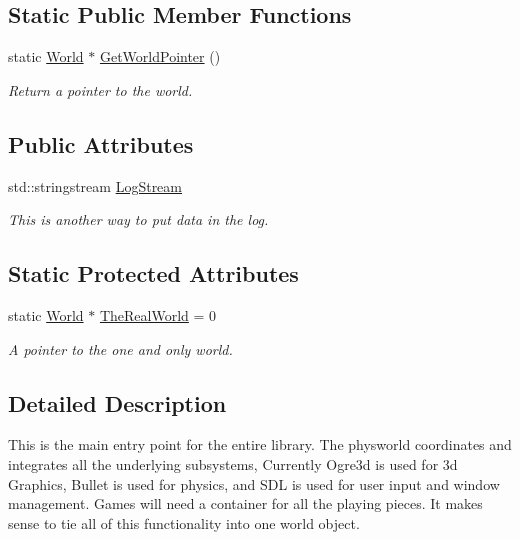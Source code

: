 \subsection*{Static Public Member Functions}
\begin{DoxyCompactItemize}
\item 
static \hyperlink{classphys_1_1World}{World} $\ast$ \hyperlink{classphys_1_1World_ac7b8470a75353497bf8f85a8d3cd24e4}{GetWorldPointer} ()
\begin{DoxyCompactList}\small\item\em Return a pointer to the world. \item\end{DoxyCompactList}\end{DoxyCompactItemize}
\subsection*{Public Attributes}
\begin{DoxyCompactItemize}
\item 
std::stringstream \hyperlink{classphys_1_1World_a6d8b325a077afc924afb70c259ec0299}{LogStream}
\begin{DoxyCompactList}\small\item\em This is another way to put data in the log. \item\end{DoxyCompactList}\end{DoxyCompactItemize}
\subsection*{Static Protected Attributes}
\begin{DoxyCompactItemize}
\item 
static \hyperlink{classphys_1_1World}{World} $\ast$ \hyperlink{classphys_1_1World_a78f9e764aa85ac44d6f7fa7158377757}{TheRealWorld} = 0
\begin{DoxyCompactList}\small\item\em A pointer to the one and only world. \item\end{DoxyCompactList}\end{DoxyCompactItemize}


\subsection{Detailed Description}
This is the main entry point for the entire library. The physworld coordinates and integrates all the underlying subsystems, Currently Ogre3d is used for 3d Graphics, Bullet is used for physics, and SDL is used for user input and window management. Games will need a container for all the playing pieces. It makes sense to tie all of this functionality into one world object. 

